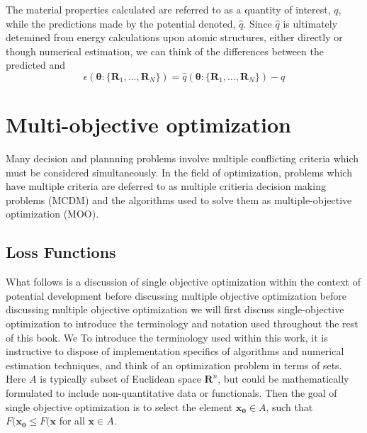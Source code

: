 The material properties calculated are referred to as a quantity of interest, $q$, while the predictions made by the potential denoted, $\hat{q}$.  Since $\hat{q}$ is ultimately detemined from energy calculations upon atomic structures, either directly or though numerical estimation, we can think of the differences between the predicted and
\begin{equation}
	\epsilon(\bm{\theta}:\{\bm{R}_1,...,\bm{R}_N\})=\hat{q}(\bm{\theta}:\{\bm{R}_1,...,\bm{R}_N\})-q
\end{equation}
\subsection{}

\section{Multi-objective optimization}

Many decision and plannning problems involve multiple conflicting criteria which must be considered simultaneously.
In the field of optimization, problems which have multiple criteria are deferred to as multiple critieria decision making problems (MCDM) and the algorithms used to solve them as multiple-objective optimization (MOO).

\subsection{Loss Functions}

What follows is a discussion of single objective optimization within the context of potential development before discussing multiple objective optimization  before discussing multiple objective optimization we will first discuss single-objective optimization to introduce the terminology and notation used throughout the rest of this book.
We
To introduce the terminology used within this work, it is instructive to dispose of implementation specifics of algorithms and numerical estimation techniques, and think of an optimization problem in terms of sets.
Here $A$ is typically subset of Euclidean space $\bm{R}^n$, but could be mathematically formulated to include non-quantitative data or functionals.
Then the goal of single objective optimization is to select the element $\bm{x_0} \in A$, such that $F(\bm{x_0} \leq F(\bm{x}$ for all $\bm{x} \in A$.

